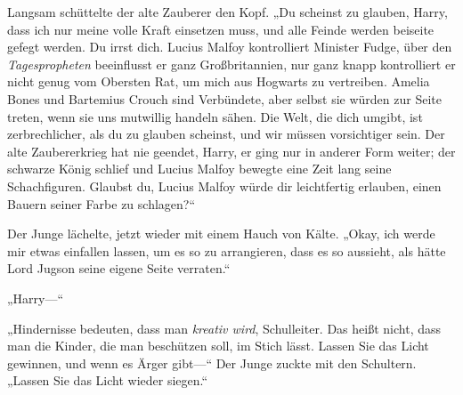 Langsam schüttelte der alte Zauberer den Kopf. „Du scheinst zu glauben, Harry, dass ich nur meine volle Kraft einsetzen muss, und alle Feinde werden beiseite gefegt werden. Du irrst dich. Lucius Malfoy kontrolliert Minister Fudge, über den \emph{Tagespropheten} beeinflusst er ganz Großbritannien, nur ganz knapp kontrolliert er nicht genug vom Obersten Rat, um mich aus Hogwarts zu vertreiben. Amelia Bones und Bartemius Crouch sind Verbündete, aber selbst sie würden zur Seite treten, wenn sie uns mutwillig handeln sähen. Die Welt, die dich umgibt, ist zerbrechlicher, als du zu glauben scheinst, und wir müssen vorsichtiger sein. Der alte Zaubererkrieg hat nie geendet, Harry, er ging nur in anderer Form weiter; der schwarze König schlief und Lucius Malfoy bewegte eine Zeit lang seine Schachfiguren. Glaubst du, Lucius Malfoy würde dir leichtfertig erlauben, einen Bauern seiner Farbe zu schlagen?“

Der Junge lächelte, jetzt wieder mit einem Hauch von Kälte. „Okay, ich werde mir etwas einfallen lassen, um es so zu arrangieren, dass es so aussieht, als hätte Lord Jugson seine eigene Seite verraten.“

„Harry—“

„Hindernisse bedeuten, dass man \emph{kreativ wird}, Schulleiter. Das heißt nicht, dass man die Kinder, die man beschützen soll, im Stich lässt. Lassen Sie das Licht gewinnen, und wenn es Ärger gibt—“ Der Junge zuckte mit den Schultern. „Lassen Sie das Licht wieder siegen.“


